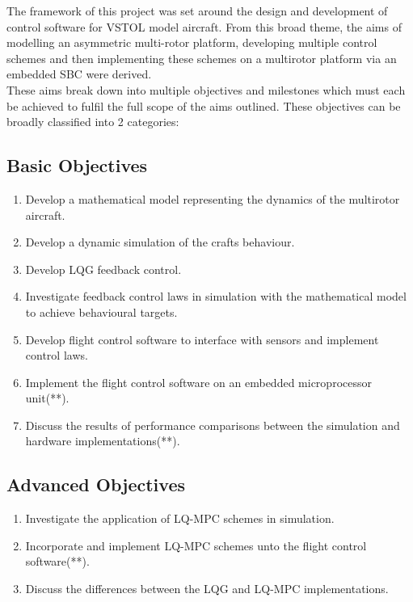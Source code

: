 \documentclass[12pt,a4paper,twoside]{report}
\begin{document}
			The framework of this project was set around the design and development of control software for VSTOL model aircraft. From this broad theme, the aims of modelling an asymmetric multi-rotor platform, developing multiple control schemes and then implementing these schemes on a multirotor platform via an embedded SBC were derived.
			\\
			These aims break down into multiple objectives and milestones which must each be achieved to fulfil the full scope of the aims outlined. These objectives can be broadly classified into 2 categories: 
	
				\subsection{Basic Objectives}
				
					\begin{enumerate}
						\item
							Develop a mathematical model representing the dynamics of the multirotor aircraft.
						\item
							Develop a dynamic simulation of the crafts behaviour.
						\item
							Develop LQG feedback control.
						\item
							Investigate feedback control laws in simulation with the mathematical model to achieve behavioural targets.
						\item
							Develop flight control software to interface with sensors and implement control laws.
						\item
							Implement the flight control software on an embedded microprocessor unit(**).
						\item
							Discuss the results of performance comparisons between the simulation and hardware implementations(**).
					\end{enumerate}
				
				\subsection{Advanced Objectives}
				
					\begin{enumerate}
						\item
							Investigate the application of LQ-MPC schemes in simulation.
						\item	
							Incorporate and implement LQ-MPC schemes unto the flight control software(**).
						\item	
							Discuss the differences between the LQG and LQ-MPC implementations.
					\end{enumerate}
				
\end{document}

